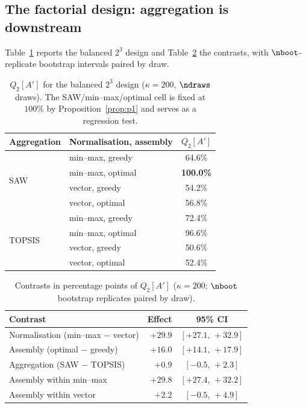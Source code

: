 \subsection{The factorial design: aggregation is downstream}
\label{sec:factorial}

Table~\ref{tab:factorial} reports the balanced $2^3$ design and
Table~\ref{tab:effects} the contrasts, with $\nboot$-replicate bootstrap
intervals paired by draw.

\begin{table}[t]
\centering
\caption{$Q_2[A']$ for the balanced $2^3$ design ($\kappa=200$,
  $\ndraws$ draws). The SAW/min--max/optimal cell is fixed at $100\%$ by
  Proposition~\ref{prop:p1} and serves as a regression test.}
\label{tab:factorial}
\begin{tabular}{llc}
\toprule
Aggregation & Normalisation, assembly & $Q_2[A']$ \\
\midrule
\multirow{4}{*}{SAW}
 & min--max, greedy  & 64.6\% \\
 & min--max, optimal & \textbf{100.0\%} \\
 & vector, greedy    & 54.2\% \\
 & vector, optimal   & 56.8\% \\
\midrule
\multirow{4}{*}{TOPSIS}
 & min--max, greedy  & 72.4\% \\
 & min--max, optimal & 96.6\% \\
 & vector, greedy    & 50.6\% \\
 & vector, optimal   & 52.4\% \\
\bottomrule
\end{tabular}
\end{table}

\begin{table}[t]
\centering
\caption{Contrasts in percentage points of $Q_2[A']$ ($\kappa=200$;
  $\nboot$ bootstrap replicates paired by draw).}
\label{tab:effects}
\begin{tabular}{lrc}
\toprule
Contrast & Effect & 95\% CI \\
\midrule
Normalisation (min--max $-$ vector) & $+29.9$ & $[+27.1,\,+32.9]$ \\
Assembly (optimal $-$ greedy)       & $+16.0$ & $[+14.1,\,+17.9]$ \\
Aggregation (SAW $-$ TOPSIS)        & $+0.9$  & $[-0.5,\,+2.3]$ \\
\midrule
Assembly within min--max            & $+29.8$ & $[+27.4,\,+32.2]$ \\
Assembly within vector              & $+2.2$  & $[-0.5,\,+4.9]$ \\
\bottomrule
\end{tabular}
\end{table}

